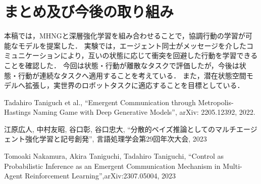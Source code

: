\documentclass[twocolumn,a4j]{jarticle}
\begin{document}
\section{まとめ及び今後の取り組み}
本稿では，MHNGと深層強化学習を組み合わせることで，協調行動の学習が可能なモデルを提案した．
実験では，エージェント同士がメッセージを介したコミュニケーションにより，互いの状態に応じて衝突を回避した行動を学習できることを確認した．
今回は状態・行動が離散なタスクで評価したが，今後は状態・行動が連続なタスクへ適用することを考えている．
また，潜在状態空間モデルへ拡張し，実世界のロボットタスクに適応することを目標としている．
%
\vspace*{-0.55cm}
\small
\begin{thebibliography}{99}
Tadahiro Taniguch et al., ``Emergent Communication through Metropolis-Hastings Naming Game with Deep Generative Models'', arXiv: 2205.12392, 2022.

江原広人, 中村友昭, 谷口彰, 谷口忠大, ``分散的ベイズ推論としてのマルチエージェント強化学習と記号創発'', 言語処理学会第29回年次大会, 2023

Tomoaki Nakamura, Akira Taniguchi, Tadahiro Taniguchi, ``Control as Probabilistic Inference as an Emergent Communication Mechanism in Multi-Agent Reinforcement Learning'',arXiv:2307.05004, 2023


\end{thebibliography}
%
\thispagestyle{fancy}
\renewcommand{\headrulewidth}{0.0pt}
\end{document}
